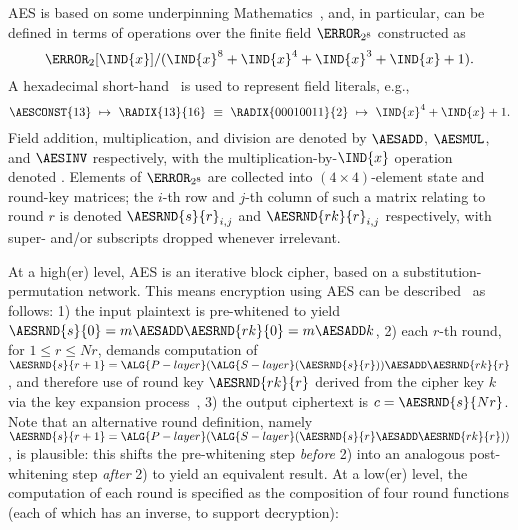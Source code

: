 AES is based on some underpinning Mathematics~\cite[Section 4]{FIPS:197},
and, in particular, can be defined in terms of operations over the finite 
field $\F_{2^8}$ constructed as
\[
\F_{2}[\IND{x}] / ( \IND{x}^8 + \IND{x}^4 + \IND{x}^3 + \IND{x} + 1 ) .
\]
A hexadecimal short-hand~\cite[Section 3.2]{FIPS:197} is used to represent 
field literals, e.g.,
\[
\AESCONST{13} ~\mapsto~ \RADIX{13}{16} ~\equiv~ \RADIX{00010011}{2} ~\mapsto~ \IND{x}^4 + \IND{x} + 1 .
\]
Field 
      addition, 
multiplication, 
and  
      division
are denoted by
$\AESADD$,
$\AESMUL$,
and
$\AESINV$
respectively,
with the multiplication-by-$\IND{x}$ operation~\cite[Section 4.2.1]{FIPS:197} 
denoted .
Elements of $\F_{2^8}$ are collected into $( 4 \times 4 )$-element state
and round-key matrices; the $i$-th row and $j$-th column of such a matrix 
relating to round $r$ is denoted
$\AESRND {s}{r}_{i,j}$
and
$\AESRND{rk}{r}_{i,j}$
respectively, with super- and/or subscripts dropped whenever irrelevant.

At a high(er) level, 
AES is an iterative block cipher, based on a substitution-permutation network.
This means encryption using AES can be described~\cite[Section 5.2]{FIPS:197}
as follows:
1)    the  input  plaintext is pre-whitened to yield
      $\AESRND {s}{  0} = m \AESADD \AESRND{rk}{0} = m \AESADD k$,
2)    each $r$-th round, for $1 \leq r \leq Nr$, demands computation of
      $\AESRND {s}{r+1} = \ALG{P-layer}( \ALG{S-layer}( \AESRND{s}{r}                        ) ) \AESADD \AESRND{rk}{r}$,
      and therefore use of round key
      $\AESRND{rk}{r  }$
      derived from the cipher key $k$ via the key expansion process~\cite[Section 5.2]{FIPS:197},
3)    the output ciphertext is
      $c = \AESRND{s}{Nr}$.
Note that an alternative round definition, namely
      $\AESRND {s}{r+1} = \ALG{P-layer}( \ALG{S-layer}( \AESRND{s}{r} \AESADD \AESRND{rk}{r} ) )                       $ ,
is plausible: this shifts the 
 pre-whitening step {\em before} 2) 
into an analogous 
post-whitening step {\em  after} 2)
to yield an equivalent result.
At a  low(er) level,
the computation of each round is specified as the composition of four 
round functions (each of which has an inverse, to support decryption):

